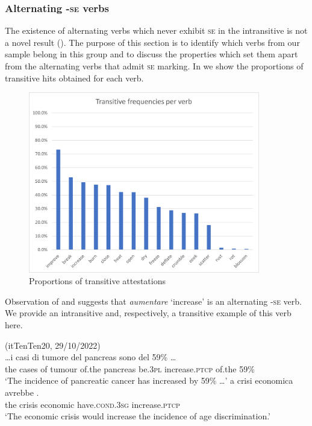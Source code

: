 \documentclass[output=paper,colorlinks,citecolor=brown
]{langscibook}
\begin{document}
\subsubsection{Alternating -\textsc{se} verbs}
\label{bentley_section_3.3.1}
The existence of alternating verbs which never exhibit \textsc{se} in the intransitive is not a novel result (). The purpose of this section is to identify which verbs from our sample belong in this group and to discuss the properties which set them apart from the alternating verbs that admit \textsc{se} marking. In  we show the proportions of transitive hits obtained for each verb.

\begin{figure}
\includegraphics[width=0.9\textwidth]{bentley_figure2.png}
\caption{\label{fig:bentley_figure_2}Proportions of transitive attestations }
\end{figure}    

Observation of  and  suggests that \textit{aumentare} ‘increase’ is an alternating   -\textsc{se} verb. We provide an intransitive and, respectively, a transitive example of this verb here.

\hspace*{\fill}\quad

\ea (itTenTen20, 29/10/2022)\label{bentley_example_8}\\
    \gll  \ldots  i casi di tumore del pancreas sono  del 59\%  \ldots  \\
    the cases of tumour of.the pancreas be.3\textsc{pl} increase.\textsc{ptcp} of.the 59\% \\
    \glt ‘The incidence of pancreatic cancer has increased by 59\% \ldots ’
\ex \label{bentley_example_9}
    \gll [L]a	crisi		economica	avrebbe 							.  \\
    the		crisis	economic		have.\textsc{cond}.3\textsc{sg}	increase.\textsc{ptcp}\\
    \glt ‘The economic crisis would increase the incidence of age discrimination.’
\z
\end{document}
